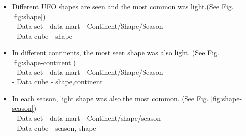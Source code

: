 \documentclass[11pt, journal]{IEEEtran}
\begin{document}
\begin{itemize}
\begin{itemize}
            \item Different UFO shapes are seen and the most common was light.(See Fig. \ref{fig:shape})\\
            - Data set - data mart - Continent/Shape/Season\\
            - Data cube - shape
                
            \item In different continents, the most seen shape was also light. (See Fig. \ref{fig:shape-continent})\\
            - Data set - data mart - Continent/Shape/Season\\
            - Data cube - shape,continent
                
            \item In each season, light shape was also the most common. (See Fig. \ref{fig:shape-season})\\
            - Data set - data mart - Continent/shape/season\\
            - Data cube - season, shape
                

\end{itemize}
\end{itemize}
\end{document}
